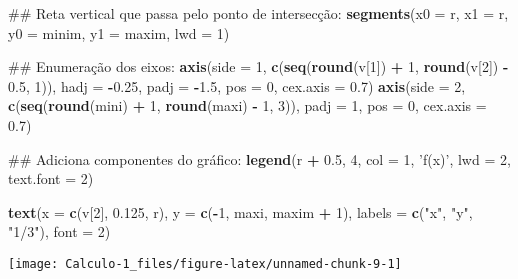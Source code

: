 \documentclass[]{book}
\newenvironment{Shaded}{\begin{snugshade}}{\end{snugshade}}
\newcommand{\KeywordTok}[1]{\textcolor[rgb]{0.13,0.29,0.53}{\textbf{#1}}}
\newcommand{\DataTypeTok}[1]{\textcolor[rgb]{0.13,0.29,0.53}{#1}}
\newcommand{\DecValTok}[1]{\textcolor[rgb]{0.00,0.00,0.81}{#1}}
\newcommand{\FloatTok}[1]{\textcolor[rgb]{0.00,0.00,0.81}{#1}}
\newcommand{\StringTok}[1]{\textcolor[rgb]{0.31,0.60,0.02}{#1}}
\newcommand{\OperatorTok}[1]{\textcolor[rgb]{0.81,0.36,0.00}{\textbf{#1}}}
\newcommand{\NormalTok}[1]{#1}
\begin{document}
\begin{enumerate}
\begin{Shaded}
\begin{Highlighting}[]
\NormalTok{##  Reta vertical que passa pelo ponto de intersecção:}
\KeywordTok{segments}\NormalTok{(}\DataTypeTok{x0 =}\NormalTok{ r, }\DataTypeTok{x1 =}\NormalTok{ r,}
     \DataTypeTok{y0 =}\NormalTok{ minim, }\DataTypeTok{y1 =}\NormalTok{ maxim, }\DataTypeTok{lwd =} \DecValTok{1}\NormalTok{)}

\NormalTok{##  Enumeração dos eixos:}
\KeywordTok{axis}\NormalTok{(}\DataTypeTok{side =} \DecValTok{1}\NormalTok{, }\KeywordTok{c}\NormalTok{(}\KeywordTok{seq}\NormalTok{(}\KeywordTok{round}\NormalTok{(v[}\DecValTok{1}\NormalTok{]) }\OperatorTok{+}\StringTok{ }\DecValTok{1}\NormalTok{, }\KeywordTok{round}\NormalTok{(v[}\DecValTok{2}\NormalTok{]) }\OperatorTok{-}\StringTok{ }\FloatTok{0.5}\NormalTok{, }\DecValTok{1}\NormalTok{)),}
 \DataTypeTok{hadj =} \OperatorTok{-}\FloatTok{0.25}\NormalTok{, }\DataTypeTok{padj =} \OperatorTok{-}\FloatTok{1.5}\NormalTok{, }\DataTypeTok{pos =} \DecValTok{0}\NormalTok{, }\DataTypeTok{cex.axis =} \FloatTok{0.7}\NormalTok{)}
\KeywordTok{axis}\NormalTok{(}\DataTypeTok{side =} \DecValTok{2}\NormalTok{, }\KeywordTok{c}\NormalTok{(}\KeywordTok{seq}\NormalTok{(}\KeywordTok{round}\NormalTok{(mini) }\OperatorTok{+}\StringTok{ }\DecValTok{1}\NormalTok{, }\KeywordTok{round}\NormalTok{(maxi) }\OperatorTok{-}\StringTok{ }\DecValTok{1}\NormalTok{, }\DecValTok{3}\NormalTok{)),}
 \DataTypeTok{padj =} \DecValTok{1}\NormalTok{, }\DataTypeTok{pos =} \DecValTok{0}\NormalTok{, }\DataTypeTok{cex.axis =} \FloatTok{0.7}\NormalTok{)}

\NormalTok{##  Adiciona componentes do gráfico:}
\KeywordTok{legend}\NormalTok{(r }\OperatorTok{+}\StringTok{ }\FloatTok{0.5}\NormalTok{, }\DecValTok{4}\NormalTok{, }\DataTypeTok{col =} \DecValTok{1}\NormalTok{, }\StringTok{'f(x)'}\NormalTok{, }\DataTypeTok{lwd =} \DecValTok{2}\NormalTok{, }\DataTypeTok{text.font =} \DecValTok{2}\NormalTok{)}

\KeywordTok{text}\NormalTok{(}\DataTypeTok{x =} \KeywordTok{c}\NormalTok{(v[}\DecValTok{2}\NormalTok{], }\FloatTok{0.125}\NormalTok{, r), }\DataTypeTok{y =} \KeywordTok{c}\NormalTok{(}\OperatorTok{-}\DecValTok{1}\NormalTok{, maxi, maxim }\OperatorTok{+}\StringTok{ }\DecValTok{1}\NormalTok{),}
 \DataTypeTok{labels =} \KeywordTok{c}\NormalTok{(}\StringTok{"x"}\NormalTok{, }\StringTok{"y"}\NormalTok{, }\StringTok{"1/3"}\NormalTok{), }\DataTypeTok{font =} \DecValTok{2}\NormalTok{)  }
\end{Highlighting}
\end{Shaded}

  \begin{center}\texttt{[image: Calculo-1\_files/figure-latex/unnamed-chunk-9-1]} \end{center}
\end{enumerate}
\end{document}
